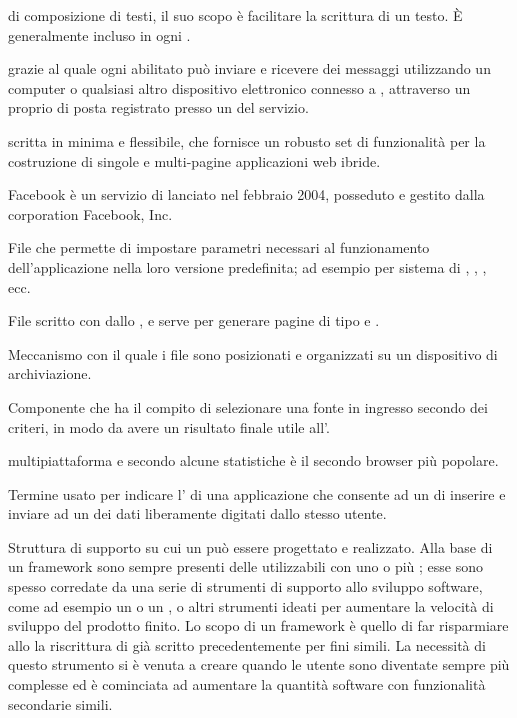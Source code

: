 { di composizione di testi, il suo scopo è facilitare la scrittura di un testo. \`{E} generalmente incluso in ogni .}

{  grazie al quale ogni  abilitato può inviare e ricevere dei messaggi utilizzando un computer o qualsiasi altro dispositivo elettronico connesso a , attraverso un proprio  di posta registrato presso un  del servizio.}

{ scritta in  minima e flessibile, che fornisce un robusto set di funzionalità per la costruzione di singole e multi-pagine applicazioni web ibride.}




{Facebook è un servizio di  lanciato nel febbraio 2004, posseduto e gestito dalla corporation Facebook, Inc.}

{File che permette di impostare parametri necessari al funzionamento dell'applicazione nella loro versione predefinita; ad esempio  per sistema di , , , ecc.}

{File scritto con   dallo , e serve per generare pagine di tipo  e .}

{Meccanismo con il quale i file sono posizionati e organizzati su un dispositivo di archiviazione.}

{Componente che ha il compito di selezionare una fonte in ingresso secondo dei criteri, in modo da avere un risultato finale utile all'.}

{  multipiattaforma e secondo alcune statistiche è il secondo browser più popolare.}

{Termine usato per indicare l' di una applicazione che consente ad un  di inserire e inviare ad un  dei dati liberamente digitati dallo stesso utente.}

{Struttura di supporto su cui un  può essere progettato e realizzato. Alla base di un framework sono sempre presenti delle  utilizzabili con uno o più ; esse sono spesso corredate da una serie di strumenti di supporto allo sviluppo software, come ad esempio un  o un , o altri strumenti ideati per aumentare la velocità di sviluppo del prodotto finito.
Lo scopo di un framework è quello di far risparmiare allo  la riscrittura di  già scritto precedentemente per fini simili. La necessità di questo strumento si è venuta a creare quando le  utente sono diventate sempre più complesse ed è cominciata ad aumentare la quantità software con funzionalità secondarie simili.}


